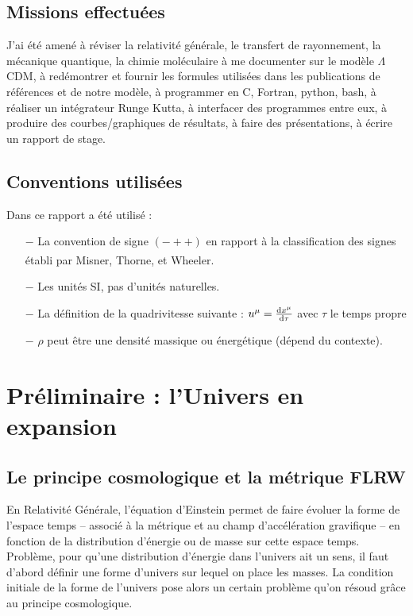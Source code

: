 \documentclass[10pt, a4paper]{report}
\numberwithin{equation}{subsection}
\begin{document}
\subsection*{Missions effectuées}

J'ai été amené à réviser la relativité générale, le transfert de rayonnement, la mécanique quantique, la chimie moléculaire à me documenter sur le modèle $\Lambda$CDM, à redémontrer et fournir les formules utilisées dans les publications de références et de notre modèle, à programmer en C, Fortran, python, bash, à réaliser un intégrateur Runge Kutta, à interfacer des programmes entre eux, à produire des courbes/graphiques de résultats, à faire des présentations, à écrire un rapport de stage.



\subsection*{Conventions utilisées}

Dans ce rapport a été utilisé :
\begin{itemize}
	\item[$-$] La convention de signe $(-++)$ en rapport à la classification des signes établi par Misner, Thorne, et Wheeler\textsuperscript{\cite{Signes}}.
	\item[$-$] Les unités SI, pas d'unités naturelles.
	\item[$-$] La définition de la quadrivitesse suivante : $u^\mu = \frac{{\rm d}x^\mu}{{\rm d}\tau}$ avec $\tau$ le temps propre
	\item[$-$] $\rho$ peut être une densité massique ou énergétique (dépend du contexte).
\end{itemize}



\section{Préliminaire : l'Univers en expansion}

\subsection{Le principe cosmologique et la métrique FLRW}
En Relativité Générale, l'équation d'Einstein permet de faire évoluer la forme de l'espace temps -- associé à la métrique et au champ d'accélération gravifique -- en fonction de la distribution d'énergie ou de masse sur cette espace temps. Problème, pour qu'une distribution d'énergie dans l'univers ait un sens, il faut d'abord définir une forme d'univers sur lequel on place les masses. La condition initiale de la forme de l'univers pose alors un certain problème qu'on résoud grâce au principe cosmologique.
\end{document}
